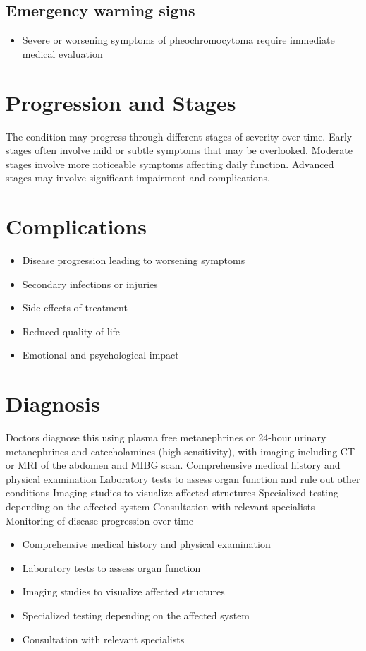 \subsection{Emergency warning signs}
\begin{itemize}[noitemsep]
  \item Severe or worsening symptoms of pheochromocytoma require immediate medical evaluation
\end{itemize}
\section{Progression and Stages}
The condition may progress through different stages of severity over time. Early stages often involve mild or subtle symptoms that may be overlooked. Moderate stages involve more noticeable symptoms affecting daily function. Advanced stages may involve significant impairment and complications.
\section{Complications}
\begin{itemize}[noitemsep]
  \item Disease progression leading to worsening symptoms
  \item Secondary infections or injuries
  \item Side effects of treatment
  \item Reduced quality of life
  \item Emotional and psychological impact
\end{itemize}
\section{Diagnosis}
Doctors diagnose this using plasma free metanephrines or 24-hour urinary metanephrines and catecholamines (high sensitivity), with imaging including CT or MRI of the abdomen and MIBG scan. Comprehensive medical history and physical examination Laboratory tests to assess organ function and rule out other conditions Imaging studies to visualize affected structures Specialized testing depending on the affected system Consultation with relevant specialists Monitoring of disease progression over time

\begin{itemize}[noitemsep]
  \item Comprehensive medical history and physical examination
  \item Laboratory tests to assess organ function
  \item Imaging studies to visualize affected structures
  \item Specialized testing depending on the affected system
  \item Consultation with relevant specialists
\end{itemize}
